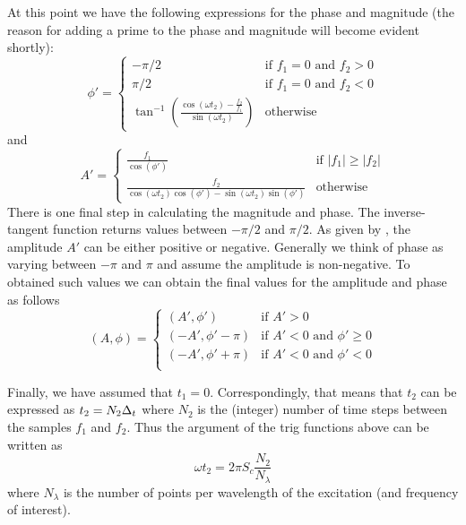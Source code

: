 At this point we have the following expressions for the phase and
magnitude (the reason for adding a prime to the phase and magnitude
will become evident shortly):
\begin{equation}
  \phi' = \left\{
  \begin{array}{ll}
  -\pi/2 & \mbox{if $f_1 = 0$ and $f_2 > 0$} \\
  \pi/2 & \mbox{if $f_1 = 0$ and $f_2 < 0$} \\
  \tan^{-1}\!
  \left(\frac{\cos(\omega t_2) - \frac{f_2}{f_1}}
       {\sin(\omega t_2)}\right)
  & \mbox{otherwise}
  \end{array}
  \right.
\end{equation}
and
\begin{equation}
  A' = \left\{
  \begin{array}{ll}
   \frac{f_1}{\cos(\phi')} & \mbox{if $|f_1| \geq |f_2|$} \\
   \frac{f_2}{\cos(\omega t_2)\cos(\phi') - \sin(\omega t_2)\sin(\phi')}
   & \mbox{otherwise}
  \end{array}
  \right.
  \label{eq:ampEqFour}
\end{equation}
There is one final step in calculating the magnitude and phase.  The
inverse-tangent function returns values between $-\pi/2$ and $\pi/2$.
As given by , the amplitude $A'$ can be either
positive or negative.  Generally we think of phase as varying between
$-\pi$ and $\pi$ and assume the amplitude is non-negative.
To obtained such values we can obtain the final values for the
amplitude and phase as follows
\begin{equation}
  (A,\phi) = \left\{
  \begin{array}{ll}
   (A',\phi') & \mbox{if $A'>0$} \\
   (-A',\phi'-\pi) & \mbox{if $A'<0$ and $\phi'\geq 0$} \\
   (-A',\phi'+\pi) & \mbox{if $A'<0$ and $\phi'< 0$} \\
  \end{array}
  \right.
  \label{eq:ampPhaseFinal}
\end{equation}

Finally, we have assumed that $t_1=0$.  Correspondingly, that means
that $t_2$ can be expressed as $t_2=N_2\Delta_t$ where $N_2$ is the
(integer) number of time steps between the samples $f_1$ and $f_2$.
Thus the argument of the trig functions above can be written as
\begin{equation}
  \omega t_2 = 2\pi S_c \frac{N_2}{N_\lambda}
\end{equation}
where $N_\lambda$ is the number of points per wavelength of the
excitation (and frequency of interest).

